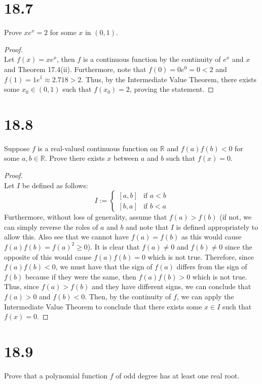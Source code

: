 \documentclass[10pt,a4paper]{article}
\theoremstyle{definition}
\begin{document}
\section*{18.7}
Prove $xe^x = 2$ for some $x$ in $(0,1)$.

\begin{proof}{$ $}
\\Let $f(x) = xe^x$, then $f$ is a continuous function by the continuity of $e^x$ and $x$ and Theorem 17.4(ii). Furthermore, note that $f(0) = 0e^0 = 0 < 2$ and $f(1) = 1e^1 \approx 2.718 > 2$. Thus, by the Intermediate Value Theorem, there exists some $x_0 \in (0,1)$ such that $f(x_0) = 2$, proving the statement. 
\end{proof}

\section*{18.8}
Suppose $f$ is a real-valued continuous function on $\mathbb{R}$ and $f(a)f(b) < 0$ for some $a,b \in \mathbb{R}$. Prove there exists $x$ between $a$ and $b$ such that $f(x) = 0$.

\begin{proof}{$ $}
\\Let $I$ be defined as follows:
\[I := 
\begin{cases}
[a,b] &\text{if $a<b$}\\
[b,a] &\text{if $b<a$}
\end{cases}\]
Furthermore, without loss of generality, assume that $f(a) > f(b)$ (if not, we can simply reverse the roles of $a$ and $b$ and note that $I$ is defined appropriately to allow this. Also see that we cannot have $f(a) = f(b)$ as this would cause $f(a)f(b) = f(a)^2 \geq 0$). It is clear that $f(a) \neq 0$ and $f(b) \neq 0$ since the opposite of this would cause $f(a)f(b) = 0$ which is not true. Therefore, since $f(a)f(b) < 0$, we must have that the sign of $f(a)$ differs from the sign of $f(b)$ because if they were the same, then $f(a)f(b) > 0$ which is not true. Thus, since $f(a) > f(b)$ and they have different signs, we can conclude that $f(a) > 0$ and $f(b) < 0$. Then, by the continuity of $f$, we can apply the Intermediate Value Theorem to conclude that there exists some $x \in I$ such that $f(x) = 0$.
\end{proof}

\section*{18.9}
Prove that a polynomial function $f$ of odd degree has at least one real root.
\end{document}
